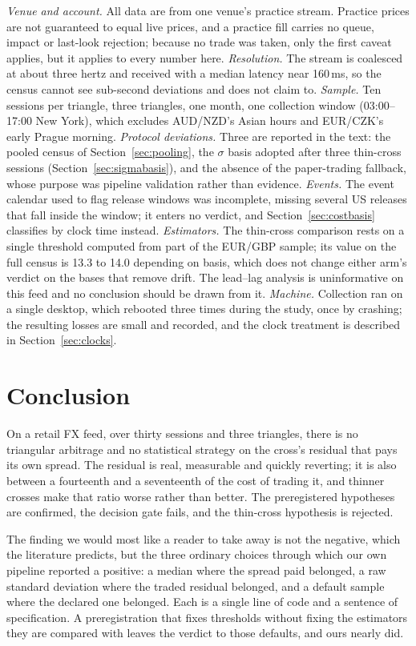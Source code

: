 \documentclass[11pt]{article}
\begin{document}
\emph{Venue and account.} All data are from one venue's practice
stream. Practice prices are not guaranteed to equal live prices, and a
practice fill carries no queue, impact or last-look rejection; because
no trade was taken, only the first caveat applies, but it applies to
every number here. \emph{Resolution.} The stream is coalesced at about
three hertz and received with a median latency near 160\,ms, so the
census cannot see sub-second deviations and does not claim to.
\emph{Sample.} Ten sessions per triangle, three triangles, one month,
one collection window (03:00--17:00 New York), which excludes AUD/NZD's
Asian hours and EUR/CZK's early Prague morning. \emph{Protocol
deviations.} Three are reported in the text: the pooled census of
Section~\ref{sec:pooling}, the $\sigma$ basis adopted after three
thin-cross sessions (Section~\ref{sec:sigmabasis}), and the absence of
the paper-trading fallback, whose purpose was pipeline validation
rather than evidence. \emph{Events.} The event calendar used to flag
release windows was incomplete, missing several US releases that fall
inside the window; it enters no verdict, and Section~\ref{sec:costbasis}
classifies by clock time instead. \emph{Estimators.} The thin-cross
comparison rests on a single threshold computed from part of the
EUR/GBP sample; its value on the full census is 13.3 to 14.0 depending
on basis, which does not change either arm's verdict on the bases that
remove drift. The lead--lag analysis is uninformative on this feed and
no conclusion should be drawn from it. \emph{Machine.} Collection ran
on a single desktop, which rebooted three times during the study, once
by crashing; the
resulting losses are small and recorded, and the clock treatment is
described in Section~\ref{sec:clocks}.

\section{Conclusion}

On a retail FX feed, over thirty sessions and three triangles, there
is no triangular arbitrage and no statistical strategy on the cross's
residual that pays its own spread. The residual is real, measurable
and quickly reverting; it is also between a fourteenth and a
seventeenth of the cost of trading it, and thinner crosses make that
ratio worse rather than better. The preregistered hypotheses are
confirmed, the decision gate fails, and the thin-cross hypothesis is
rejected.

The finding we would most like a reader to take away is not the
negative, which the literature predicts, but the three ordinary
choices through which our own pipeline reported a positive: a median
where the spread paid belonged, a raw standard deviation where the
traded residual belonged, and a default sample where the declared one
belonged. Each is a single line of code and a sentence of
specification. A preregistration that fixes thresholds without fixing
the estimators they are compared with leaves the verdict to those
defaults, and ours nearly did.
\end{document}
